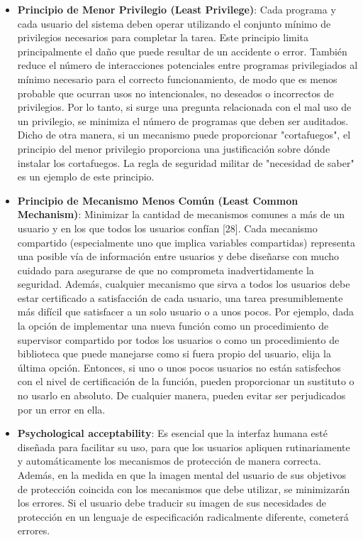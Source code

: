 \begin{itemize}
\item  \textbf{Principio de Menor Privilegio (Least Privilege)}: Cada programa y cada usuario del sistema deben operar utilizando el conjunto mínimo de privilegios necesarios para completar la tarea. Este principio limita principalmente el daño que puede resultar de un accidente o error. También reduce el número de interacciones potenciales entre programas privilegiados al mínimo necesario para el correcto funcionamiento, de modo que es menos probable que ocurran usos no intencionales, no deseados o incorrectos de privilegios. Por lo tanto, si surge una pregunta relacionada con el mal uso de un privilegio, se minimiza el número de programas que deben ser auditados. Dicho de otra manera, si un mecanismo puede proporcionar "cortafuegos", el principio del menor privilegio proporciona una justificación sobre dónde instalar los cortafuegos. La regla de seguridad militar de "necesidad de saber" es un ejemplo de este principio.

\item  \textbf{Principio de Mecanismo Menos Común (Least Common Mechanism)}: Minimizar la cantidad de mecanismos comunes a más de un usuario y en los que todos los usuarios confían [28]. Cada mecanismo compartido (especialmente uno que implica variables compartidas) representa una posible vía de información entre usuarios y debe diseñarse con mucho cuidado para asegurarse de que no comprometa inadvertidamente la seguridad. Además, cualquier mecanismo que sirva a todos los usuarios debe estar certificado a satisfacción de cada usuario, una tarea presumiblemente más difícil que satisfacer a un solo usuario o a unos pocos. Por ejemplo, dada la opción de implementar una nueva función como un procedimiento de supervisor compartido por todos los usuarios o como un procedimiento de biblioteca que puede manejarse como si fuera propio del usuario, elija la última opción. Entonces, si uno o unos pocos usuarios no están satisfechos con el nivel de certificación de la función, pueden proporcionar un sustituto o no usarlo en absoluto. De cualquier manera, pueden evitar ser perjudicados por un error en ella.

\item  \textbf{Psychological acceptability}: Es esencial que la interfaz humana esté diseñada para facilitar su uso, para que los usuarios apliquen rutinariamente y automáticamente los mecanismos de protección de manera correcta. Además, en la medida en que la imagen mental del usuario de sus objetivos de protección coincida con los mecanismos que debe utilizar, se minimizarán los errores. Si el usuario debe traducir su imagen de sus necesidades de protección en un lenguaje de especificación radicalmente diferente, cometerá errores.

\end{itemize}

















